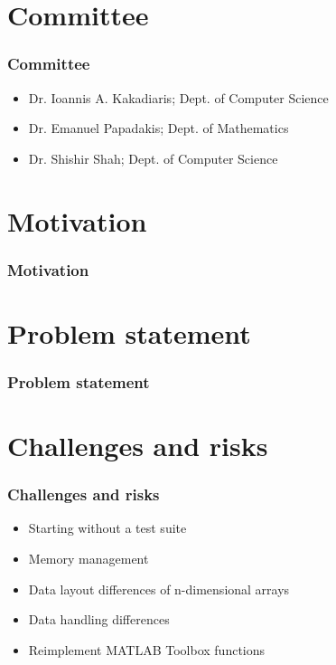 \documentclass[%
        hyperref={%
                pdfauthor={Zakariyya Mughal},%
                pdfpagemode={None},pdfpagelayout={SinglePage}}%
        xcolor={x11names},%
]{beamer}
\begin{document}
\frame{\titlepage}

\section{Committee}
\begin{frame}
\frametitle{Committee}
\begin{itemize}
	\item Dr. Ioannis A. Kakadiaris; Dept. of Computer Science
	\item Dr. Emanuel Papadakis; Dept. of Mathematics
	\item Dr. Shishir Shah; Dept. of Computer Science
\end{itemize}
\end{frame}

\section{Motivation}
\begin{frame}
\frametitle{Motivation}
\end{frame}

\section{Problem statement}
\begin{frame}
\frametitle{Problem statement}
\end{frame}

\section{Challenges and risks}
\begin{frame}
\frametitle{Challenges and risks}
\begin{itemize}
	\item Starting without a test suite
	\item Memory management
	\item Data layout differences of n-dimensional arrays
	\item Data handling differences
	\item Reimplement MATLAB Toolbox functions
\end{itemize}
\end{frame}
\end{document}

